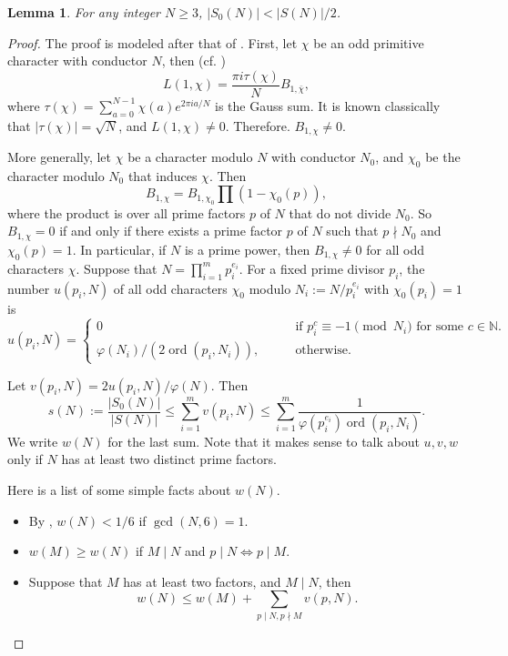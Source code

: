 \documentclass{amsart}[11pt]
\newtheorem{lem}[thm]{Lemma}
\theoremstyle{definition}
\numberwithin{equation}{section}
\theoremstyle{notitle}
\begin{document}
\begin{lem}
  For any integer $N\geq 3$, ${\lvert {S_0(N)} \rvert}<{\lvert {S(N)} \rvert}/2$.
\end{lem}
\begin{proof}
  The proof is modeled after that of \cite[Proposition,
  p.~1190]{MR511556}. First, let $\chi$ be an odd primitive character
  with conductor $N$, then (cf. \cite[Chapter 4]{MR1421575})
  \[ L(1,\chi)= \frac{\pi i\tau(\chi)}{N} B_{1,\bar{\chi}},\] where
  $\tau(\chi)=\sum_{a=0}^{N-1}\chi(a)e^{2\pi i a/N}$ is the Gauss
  sum. It is known classically that ${\lvert {\tau(\chi)} \rvert}=\sqrt{N}$, and
  $L(1,\chi)\neq 0$. Therefore. $B_{1,\chi}\neq 0$.

  More generally, let $\chi$ be a character modulo $N$ with conductor
  $N_0$, and $\chi_0$ be the character modulo $N_0$ that induces
  $\chi$. Then 
  \[ B_{1, \chi}=B_{1, \chi_0} \prod (1-\chi_0(p)),\] where the
  product is over all prime factors $p$ of $N$ that do not divide
  $N_0$. So $B_{1, \chi}=0$ if and only if there exists a prime factor
  $p$ of $N$ such that $p\nmid N_0$ and $\chi_0(p)=1$. In particular,
  if $N$ is a prime power, then $B_{1,\chi}\neq 0$ for all odd
  characters $\chi$.  Suppose that $N=\prod_{i=1}^m p_i^{e_i}$. For a
  fixed prime divisor $p_i$, the number $u(p_i,N)$ of all odd characters
  $\chi_0$ modulo $N_i:=N/p_i^{e_i}$ with $\chi_0(p_i)=1$ is
\[ u(p_i,N)=
\begin{cases}
  0  \qquad & \text{if } p_i^c \equiv -1 \pmod{N_i} \text{ for some } c
  \in {\mathbb{N}}.  \\
  \varphi(N_i)/(2\operatorname{ord}(p_i, N_i)), \qquad & \text{otherwise. }
\end{cases}
\] 

Let $v(p_i,N) = 2u(p_i,N)/\varphi(N)$.  Then 
\[s(N):=\frac{{\lvert {S_0(N)} \rvert}}{{\lvert {S(N)} \rvert}}\leq \sum_{i=1}^m v(p_i,N) \leq
\sum_{i=1}^m \frac{1}{\varphi(p_i^{e_i})\operatorname{ord}(p_i, N_i)}. \]
We write $w(N)$ for the last sum. Note that it makes sense to talk
about $u, v,w$ only if $N$ has at least two distinct prime factors. 

Here is a  list of some simple facts about $w(N)$. \\
\begin{itemize}
\item  By \cite[Proposition, p.~1190]{MR511556}, $w(N)<1/6$ if $\gcd(N,
6)=1$.\\
\item  $w(M)\geq w(N)$ if $M\mid N$ and $p\mid N \Leftrightarrow p\mid M$.\\
\item  Suppose that $M$ has at least two factors, and $M\mid N$, then  
\[ w(N)\leq w(M)+\sum_{p\mid N, p \nmid M} v(p, N).\]
\end{itemize}


\end{proof}
\end{document}
